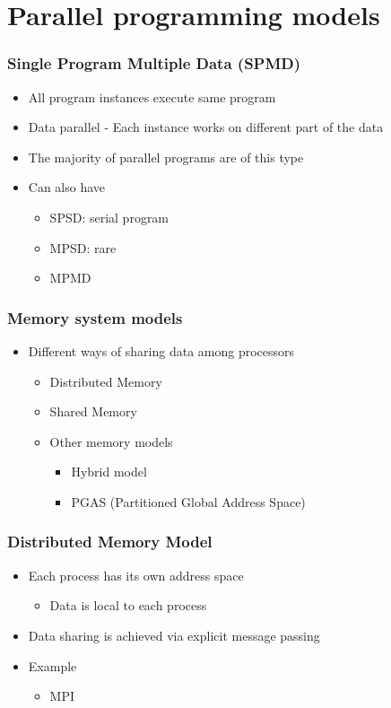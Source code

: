 \documentclass[10pt,t]{beamer}
\begin{document}
\section{Parallel programming models}
\begin{frame}
  \frametitle{Single Program Multiple Data (SPMD)}
  \begin{itemize}
  \item All program instances execute same program
  \item Data parallel - Each instance works on different part of the data
  \item The majority of parallel programs are of this type
  \item Can also have
    \begin{itemize}
    \item SPSD: serial program
    \item MPSD: rare
    \item MPMD 
    \end{itemize}
  \end{itemize}
\end{frame}

\begin{frame}
  \frametitle{Memory system models}
  \begin{itemize}
  \item Different ways of sharing data among processors
    \begin{itemize}
    \item Distributed Memory
    \item Shared Memory
    \item Other memory models
      \begin{itemize}
      \item Hybrid model
      \item PGAS (Partitioned Global Address Space) 
      \end{itemize}
    \end{itemize}
  \end{itemize}
\end{frame}

\begin{frame}
  \frametitle{Distributed Memory Model}
  \begin{itemize}
  \item Each process has its own address space
    \begin{itemize}
    \item Data is local to each process
    \end{itemize}
  \item Data sharing is achieved via explicit message passing
  \item Example
    \begin{itemize}
    \item MPI
    \end{itemize}
  \end{itemize}
  
\end{frame}
\end{document}
